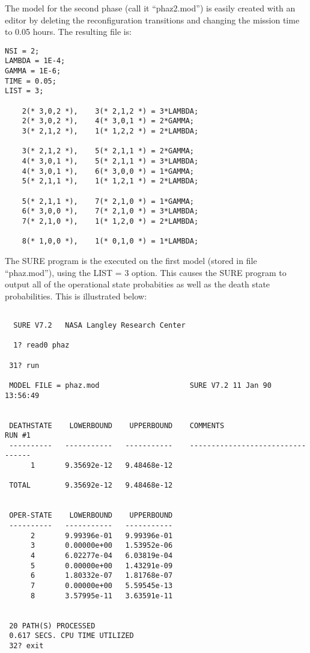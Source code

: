 The model for the second phase (call it ``phaz2.mod'') is easily
created with an editor by deleting the reconfiguration transitions and
changing the mission time to 0.05 hours.  The resulting file is:

\begin{verbatim}
NSI = 2;
LAMBDA = 1E-4;
GAMMA = 1E-6;
TIME = 0.05;
LIST = 3;

    2(* 3,0,2 *),    3(* 2,1,2 *) = 3*LAMBDA;
    2(* 3,0,2 *),    4(* 3,0,1 *) = 2*GAMMA;
    3(* 2,1,2 *),    1(* 1,2,2 *) = 2*LAMBDA;

    3(* 2,1,2 *),    5(* 2,1,1 *) = 2*GAMMA;
    4(* 3,0,1 *),    5(* 2,1,1 *) = 3*LAMBDA;
    4(* 3,0,1 *),    6(* 3,0,0 *) = 1*GAMMA;
    5(* 2,1,1 *),    1(* 1,2,1 *) = 2*LAMBDA;

    5(* 2,1,1 *),    7(* 2,1,0 *) = 1*GAMMA;
    6(* 3,0,0 *),    7(* 2,1,0 *) = 3*LAMBDA;
    7(* 2,1,0 *),    1(* 1,2,0 *) = 2*LAMBDA;

    8(* 1,0,0 *),    1(* 0,1,0 *) = 1*LAMBDA;

\end{verbatim}

The SURE program is the executed on the first model (stored in file
``phaz.mod''), using the LIST = 3 option.  This causes the SURE program
to output all of the operational state probabities as well as the
death state probabilities. This is illustrated below:

\begin{verbatim}

  SURE V7.2   NASA Langley Research Center

  1? read0 phaz

 31? run

 MODEL FILE = phaz.mod                     SURE V7.2 11 Jan 90   13:56:49


 DEATHSTATE    LOWERBOUND    UPPERBOUND    COMMENTS                 RUN #1
 ----------   -----------   -----------    ---------------------------------
      1       9.35692e-12   9.48468e-12

 TOTAL        9.35692e-12   9.48468e-12


 OPER-STATE    LOWERBOUND    UPPERBOUND
 ----------   -----------   -----------
      2       9.99396e-01   9.99396e-01
      3       0.00000e+00   1.53952e-06
      4       6.02277e-04   6.03819e-04
      5       0.00000e+00   1.43291e-09
      6       1.80332e-07   1.81768e-07
      7       0.00000e+00   5.59545e-13
      8       3.57995e-11   3.63591e-11


 20 PATH(S) PROCESSED
 0.617 SECS. CPU TIME UTILIZED
 32? exit
\end{verbatim}

